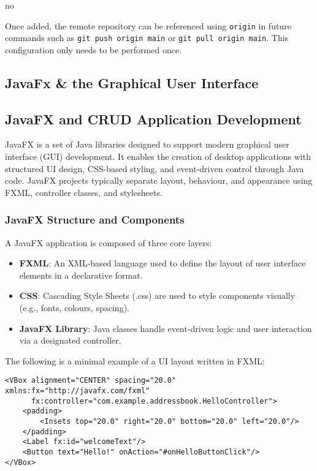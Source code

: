 no\documentclass{article}
\newcommand{\codecmd}[1]{\textcolor[rgb]{0,0.5,0}{\texttt{#1}}}
\begin{document}
\noindent Once added, the remote repository can be referenced using \codecmd{origin} in future commands such as \codecmd{git push origin main} or \codecmd{git pull origin main}. This configuration only needs to be performed once.

\subsection{JavaFx \& the Graphical User Interface }

\subsection{JavaFX and CRUD Application Development}

JavaFX is a set of Java libraries designed to support modern graphical user interface (GUI) development. It enables the creation of desktop applications with structured UI design, CSS-based styling, and event-driven control through Java code. JavaFX projects typically separate layout, behaviour, and appearance using FXML, controller classes, and stylesheets.

\subsubsection{JavaFX Structure and Components}

A JavaFX application is composed of three core layers:

\begin{itemize}
    \item \textbf{FXML}: An XML-based language used to define the layout of user interface elements in a declarative format.
    \item \textbf{CSS}: Cascading Style Sheets (.css) are used to style components visually (e.g., fonts, colours, spacing).
    \item \textbf{JavaFX Library}: Java classes handle event-driven logic and user interaction via a designated controller.
\end{itemize}

The following is a minimal example of a UI layout written in FXML:

\begin{verbatim}
<VBox alignment="CENTER" spacing="20.0" xmlns:fx="http://javafx.com/fxml"
      fx:controller="com.example.addressbook.HelloController">
    <padding>
        <Insets top="20.0" right="20.0" bottom="20.0" left="20.0"/>
    </padding>
    <Label fx:id="welcomeText"/>
    <Button text="Hello!" onAction="#onHelloButtonClick"/>
</VBox>
\end{verbatim}
\end{document}
